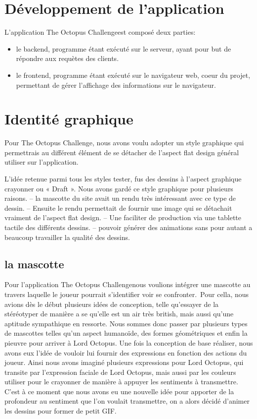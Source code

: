 \documentclass[a4paper,11pt, oneside]{book}
\def\appName{The Octopus Challenge}
\def\octopusName{Lord Octopus}
\begin{document}
\clearpage
\section{Développement de l'application}


L'application \appName est composé deux parties:
\begin{itemize}
	\item le backend, programme étant exécuté sur le serveur, ayant pour but de répondre aux requètes des clients.
	\item le frontend, programme étant exécuté sur le navigateur web, coeur du projet, permettant de gérer l'affichage des informations sur le navigateur.
\end{itemize}

\section{Identité graphique}

Pour \appName, nous avons voulu adopter un style graphique qui permettrais au différent élément de se détacher de l’aspect flat design général utiliser sur l’application.

L’idée retenue parmi tous les styles tester, fus des dessins à l’aspect graphique crayonner ou « Draft ».
Nous avons gardé ce style graphique pour plusieurs raisons.
– la mascotte du site avait un rendu très intéressant avec ce type de dessin. 
– Ensuite le rendu permettait de fournir une image qui se détachait vraiment de l’aspect flat design.
– Une faciliter de production via une tablette tactile des différents dessins.
– pouvoir générer des animations sans pour autant a beaucoup travailler la qualité des dessins.

\subsection*{la mascotte}
Pour l’application \appName nous voulions intégrer une mascotte au travers laquelle le joueur pourrait s’identifier voir se confronter.\
Pour cella, nous avions dès le début plusieurs idées de conception, telle qu’essayer de la stéréotyper de manière a se qu’elle est un air très british, mais aussi qu’une aptitude sympathique en ressorte.
Nous sommes donc passer par plusieurs types de mascottes telles qu’un aspect humanoïde, des formes géométriques et enfin la pieuvre pour arriver à \octopusName.
Une fois la conception de base réaliser, nous avons eux l’idée de vouloir lui fournir des expressions en fonction des actions du joueur.
Ainsi nous avons imaginé plusieurs expressions pour \octopusName, qui transite par l’expression faciale de \octopusName, mais aussi par les couleurs utiliser pour le crayonner de manière à appuyer les sentiments à transmettre. C’est à ce moment que nous avons eu une nouvelle idée pour apporter de la profondeur au sentiment que l’on voulait transmettre, on a alors décidé d’animer les dessins pour former de petit GIF.
\end{document}
